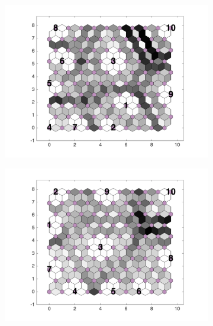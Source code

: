 \begin{figure}
\begin{subfigure}[b]{0.3\textwidth}
        \includegraphics[width=\textwidth]{../../images0.01/M31/2D/diff_dimension/combine_2D_data_between_cols3and15.png}
        \label{fig: col3and15_dist}
    \end{subfigure}
        \hfill
    \begin{subfigure}[b]{0.3\textwidth}
        \centering
        \includegraphics[width=\textwidth]{../../images0.01/M31/2D/diff_dimension/combine_2D_data_between_cols3and16.png}
        \label{fig: col3and16_dist}
    \end{subfigure}
        \hfill
    \begin{subfigure}[b]{0.3\textwidth}
        \centering

\end{subfigure}
\end{figure}

